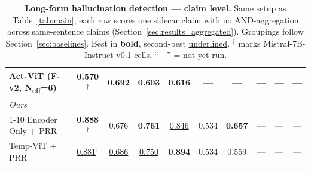 \begin{table}[t]
{\begin{tabular}{l ccc ccc ccc}
Act-ViT (F-v2, N\textsubscript{eff}=6)
                                 & 0.570$^{\dagger}$ & \textbf{0.692} & 0.603 & 0.616 & --- & --- & --- & --- & --- \\
\midrule
\multicolumn{10}{l}{\textit{Ours}} \\
\cmidrule(l){1-10}
Encoder Only + PRR               & \textbf{0.888}$^{\dagger}$ & 0.676 & \textbf{0.761} & \underline{0.846} & 0.534 & \textbf{0.657} & --- & --- & --- \\
Temp-ViT + PRR                   & \underline{0.881}$^{\dagger}$ & \underline{0.686} & \underline{0.750} & \textbf{0.894} & 0.534 & 0.559 & --- & --- & --- \\
\bottomrule
\end{tabular}%
}
\caption{\textbf{Long-form hallucination detection --- claim
level.} Same setup as Table~\ref{tab:main}; each row scores one
sidecar claim with no AND-aggregation across same-sentence claims
(Section~\ref{sec:results_aggregated}). Groupings follow
Section~\ref{sec:baselines}. Best in \textbf{bold}, second-best
\underline{underlined}. $^\dagger$ marks Mistral-7B-Instruct-v0.1
cells. ``---'' = not yet run.}
\label{tab:claim}
\end{table}

